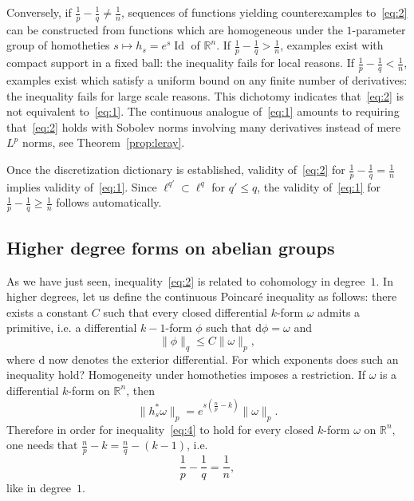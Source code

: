 \documentclass[11pt]{article}
\theoremstyle{definition}
\numberwithin{equation}{section}
\numberwithin{figure}{section}
\numberwithin{table}{section}
\DeclareMathOperator{\Id}{Id}
\newcommand{\R}{\mathbb{R}}
\newcommand{\dd}{\mathrm{d}}
\newcommand{\dphi}{\dd \phi}
\begin{document}
Conversely, if $\frac{1}{p}-\frac{1}{q}\not=\frac{1}{n}$, sequences of functions yielding counterexamples to~\eqref{eq:2} can be constructed from functions which are homogeneous under the $1$-parameter group of homotheties $s\mapsto h_s=e^{s}\Id$ of $\R^n$. If $\frac{1}{p}-\frac{1}{q}>\frac{1}{n}$, examples exist with compact support in a fixed ball: the inequality fails for local reasons. If $\frac{1}{p}-\frac{1}{q}<\frac{1}{n}$, examples exist which satisfy a uniform bound on any finite number of derivatives: the inequality fails for large scale reasons. This dichotomy indicates that~\eqref{eq:2} is not equivalent to~\eqref{eq:1}. The continuous analogue of~\eqref{eq:1} amounts to requiring that~\eqref{eq:2} holds with Sobolev norms involving many derivatives instead of mere $L^p$ norms, see Theorem~\ref{prop:leray}.

Once the discretization dictionary is established, validity of~\eqref{eq:2} for $\frac{1}{p}-\frac{1}{q}=\frac{1}{n}$ implies validity of~\eqref{eq:1}. Since $\ell^{q'}\subset \ell^{q}$ for $q'\leq q$, the validity of~\eqref{eq:1} for $\frac{1}{p}-\frac{1}{q}\geq\frac{1}{n}$ follows automatically.

\subsection{Higher degree forms on abelian groups}

As we have just seen, inequality~\eqref{eq:2} is related to cohomology in degree~$1$. In higher degrees, let us define the continuous Poincar\'e inequality as follows: there exists a constant $C$ such that every closed differential $k$-form $\omega$ admits a primitive, i.e. a differential $k-1$-form $\phi$ such that $\dphi=\omega$ and
\begin{equation}\label{eq:4}
\|\phi\|_q \leq C \|\omega\|_p,
\end{equation}
where $\dd$ now denotes the exterior differential. For which exponents does such an inequality hold? Homogeneity under homotheties imposes a restriction. If $\omega$ is a differential $k$-form on $\R^n$, then
\begin{equation}\label{eq:5}
\|h_s^*\omega\|_p=e^{s(\frac{n}{p}-k)}\|\omega\|_p.
\end{equation}
Therefore in order for inequality~\eqref{eq:4} to hold for every closed $k$-form $\omega$ on $\R^n$, one needs that $\frac{n}{p}-k=\frac{n}{q}-(k-1)$, i.e.
\begin{equation*}
\frac{1}{p}-\frac{1}{q}=\frac{1}{n},
\end{equation*}
like in degree~$1$.
\end{document}
